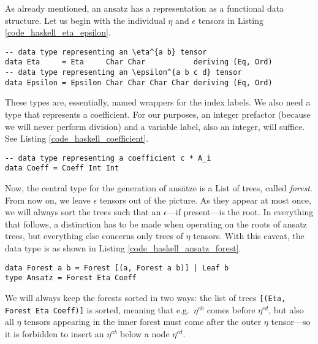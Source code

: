 As already mentioned, an ansatz has a representation as a functional data structure. Let us begin with the individual $\eta$ and $\epsilon$ tensors in Listing \ref{code_haskell_eta_epsilon}.
\begin{code}
  \begin{verbatim}
-- data type representing an \eta^{a b} tensor
data Eta     = Eta     Char Char           deriving (Eq, Ord)
-- data type representing an \epsilon^{a b c d} tensor
data Epsilon = Epsilon Char Char Char Char deriving (Eq, Ord)
  \end{verbatim}
  \label{code_haskell_eta_epsilon}
\end{code}
These types are, essentially, named wrappers for the index labels. We also need a type that represents a coefficient. For our purposes, an integer prefactor (because we will never perform division) and a variable label, also an integer, will suffice. See Listing \ref{code_haskell_coefficient}.
\begin{code}
  \begin{verbatim}
-- data type representing a coefficient c * A_i
data Coeff = Coeff Int Int
  \end{verbatim}
  \label{code_haskell_coefficient}
\end{code}
Now, the central type for the generation of ansätze is a List of trees, called \emph{forest}. From now on, we leave $\epsilon$ tensors out of the picture. As they appear at most once, we will always sort the trees such that an $\epsilon$---if present---is the root. In everything that follows, a distinction has to be made when operating on the roots of ansatz trees, but everything else concerns only trees of $\eta$ tensors. With this caveat, the data type is as shown in Listing \ref{code_haskell_ansatz_forest}.
\begin{code}
  \begin{verbatim}
data Forest a b = Forest [(a, Forest a b)] | Leaf b
type Ansatz = Forest Eta Coeff
  \end{verbatim}
  \label{code_haskell_ansatz_forest}
\end{code}
We will always keep the forests sorted in two ways: the list of trees \texttt{[(Eta, Forest Eta Coeff)]} is sorted, meaning that e.g.\ $\eta^{ab}$ comes before $\eta^{cd}$, but also all $\eta$ tensors appearing in the inner forest must come after the outer $\eta$ tensor---so it is forbidden to insert an $\eta^{ab}$ below a node $\eta^{cd}$.

